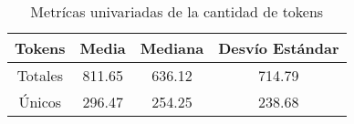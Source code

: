\begin{table}[h!]
\begin{center}
\begin{tabular}{ |c|c|c|c| }
\hline
Tokens & Media & Mediana & Desvío Estándar \\
\hline\hline
Totales & 811.65 & 636.12 & 714.79 \\
\hline
Únicos & 296.47 & 254.25 & 238.68 \\
\hline
\end{tabular}
\caption{Metrícas univariadas de la cantidad de tokens}
\label{table-tokens}
\end{center}
\end{table}

